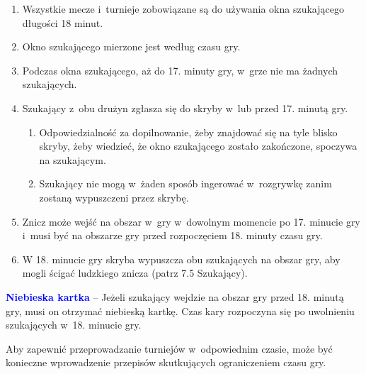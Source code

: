 \documentclass[12pt,a4paper]{article}
\renewcommand{\paragraph}[1]{
  \oldparagraph{#1}%
  \leftskip2cm
}
\newcommand\bluecard[1]{\bgroup\textcolor{blue}{\textbf{#1}}}
\begin{document}
\begin{enumerate}
	\item Wszystkie mecze i~turnieje zobowiązane są do używania okna
	      szukającego długości 18 minut.

	\item Okno szukającego mierzone jest według czasu gry.

	\item Podczas okna szukającego, aż do 17. minuty gry, w~grze nie ma żadnych
	      szukających.

	\item Szukający z~obu drużyn zgłasza się do skryby w~lub przed 17. minutą
	      gry.
	      \begin{enumerate}
		      \item Odpowiedzialność za dopilnowanie, żeby znajdować się na tyle blisko
		            skryby, żeby wiedzieć, że okno szukającego zostało zakończone, spoczywa
		            na szukającym.

		      \item Szukający nie mogą w~żaden sposób ingerować w~rozgrywkę zanim
		            zostaną wypuszczeni przez skrybę.
	      \end{enumerate}

	\item Znicz może wejść na obszar w~gry w~dowolnym momencie po 17. minucie
	      gry i~musi być na obszarze gry przed rozpoczęciem 18. minuty czasu gry.

	\item W 18. minucie gry skryba wypuszcza obu szukających na obszar gry, aby
	      mogli ścigać ludzkiego znicza (patrz 7.5 Szukający).
\end{enumerate}

\bluecard{Niebieska kartka} -- Jeżeli szukający wejdzie na obszar gry przed
18. minutą gry, musi on otrzymać niebieską kartkę. Czas kary rozpoczyna
się po uwolnieniu szukających w~18. minucie gry.

\paragraph{Regulowanie długości gry}
Aby zapewnić
przeprowadzanie turniejów w~odpowiednim czasie, może być konieczne
wprowadzenie przepisów skutkujących ograniczeniem czasu gry.
\end{document}
